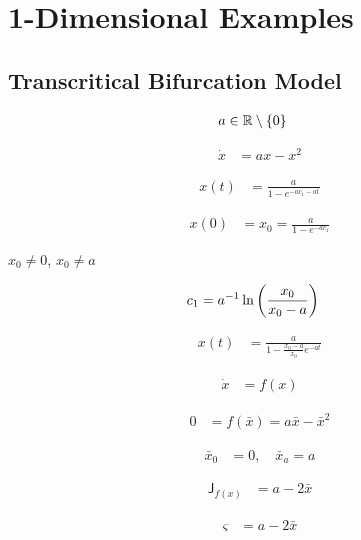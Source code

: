 \documentclass[a4paper,10pt]{article}
\begin{document}
\section{1-Dimensional Examples}

\subsection{Transcritical Bifurcation Model}

\begin{align}
	a
	&\in
	\mathbb{R}\setminus\Bqty{0}
\end{align}

\begin{align}
	\dot{x}
	&=
	ax
	-
	x^2
\end{align}

\begin{align}
	x(t)
	&=
	\frac{
		a	
	}
	{
		1
		-
		e^{-ac_1-at}
	}
\end{align}

\begin{align}
	x(0)
	&=
	x_0
	=
	\frac{
		a	
	}
	{
		1
		-
		e^{-ac_1}
	}
\end{align}

$x_0\neq 0$, $x_0\neq a$ 

\begin{align}
	c_1
	&=
	a^{-1}
	\ln\pqty{\frac{x_0}{x_0-a}}
\end{align}

\begin{align}
	x(t)
	&=
	\frac{
		a	
	}
	{
		1
		-
		\frac{x_0-a}{x_0}		
		e^{-at}
	}
\end{align}

\begin{align}
	\dot{x}
	&=
	f(x)
\end{align}

\begin{align}
	0	
	&=
	f(\bar{x})
	=
	a\bar{x}
	-	
	\bar{x}^2
\end{align}

\begin{align}
	\bar{x}_0
	&=
	0
	,\quad
	\bar{x}_a
	=
	a
\end{align}

\begin{align}
	\mathsf{J}_{f(x)}
	&=
	a-2\bar{x}
\end{align}

\begin{align}
	\varsigma
	&=
	a-2\bar{x}
\end{align}
\end{document}

